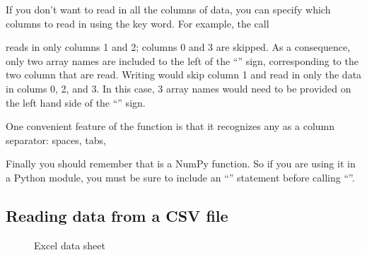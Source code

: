 \documentclass[letterpaper,10pt,english]{sphinxmanual}
\begin{document}
\sphinxAtStartPar
If you don’t want to read in all the columns of data, you can specify which columns to read in using the  key word.  For example, the call

\begin{sphinxVerbatim}[commandchars=\\\{\}]
     
\end{sphinxVerbatim}

\sphinxAtStartPar
reads in only columns 1 and 2; columns 0 and 3 are skipped.  As a consequence, only two array names are included to the left of the “\sphinxcode{\sphinxupquote{=}}” sign, corresponding to the two column that are read.  Writing  would skip column 1 and read in only the data in colums 0, 2, and 3.  In this case, 3 array names would need to be provided on the left hand side of the “\sphinxcode{\sphinxupquote{=}}” sign.

\sphinxAtStartPar
One convenient feature of the  function is that it recognizes any  as a column separator: spaces, tabs, 

\sphinxAtStartPar
Finally you should remember that  is a NumPy function.  So if you are using it in a Python module, you must be sure to include an “”  statement before calling “”.


\subsection{Reading data from a CSV file}
\label{\detokenize{chap4/chap4_io:reading-data-from-a-csv-file}}
\begin{figure}[htbp]
\centering
\capstart

\noindent{}
\caption{Excel data sheet}\label{\detokenize{chap4/chap4_io:id1}}\label{\detokenize{chap4/chap4_io:fig-excelwindow}}\end{figure}
\end{document}
